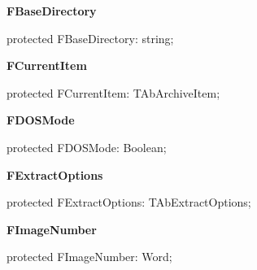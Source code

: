\documentclass{report}
\newif\ifpdf
\begin{document}
\begin{list}{}
\begin{flushleft}
\ifpdf
\end{flushleft}
\fi


\par  \label{AbArcTyp.TAbArchive-FBaseDirectory}
\item[\textbf{FBaseDirectory}\hfill]
\ifpdf
\begin{flushleft}
\fi
\begin{ttfamily}
protected FBaseDirectory: string;\end{ttfamily}

\ifpdf
\end{flushleft}
\fi


\par  \label{AbArcTyp.TAbArchive-FCurrentItem}
\item[\textbf{FCurrentItem}\hfill]
\ifpdf
\begin{flushleft}
\fi
\begin{ttfamily}
protected FCurrentItem: TAbArchiveItem;\end{ttfamily}

\ifpdf
\end{flushleft}
\fi


\par  \label{AbArcTyp.TAbArchive-FDOSMode}
\item[\textbf{FDOSMode}\hfill]
\ifpdf
\begin{flushleft}
\fi
\begin{ttfamily}
protected FDOSMode: Boolean;\end{ttfamily}

\ifpdf
\end{flushleft}
\fi


\par  \label{AbArcTyp.TAbArchive-FExtractOptions}
\item[\textbf{FExtractOptions}\hfill]
\ifpdf
\begin{flushleft}
\fi
\begin{ttfamily}
protected FExtractOptions: TAbExtractOptions;\end{ttfamily}

\ifpdf
\end{flushleft}
\fi


\par  \label{AbArcTyp.TAbArchive-FImageNumber}
\item[\textbf{FImageNumber}\hfill]
\ifpdf
\begin{flushleft}
\fi
\begin{ttfamily}
protected FImageNumber: Word;\end{ttfamily}


\end{flushleft}
\end{list}
\end{document}
